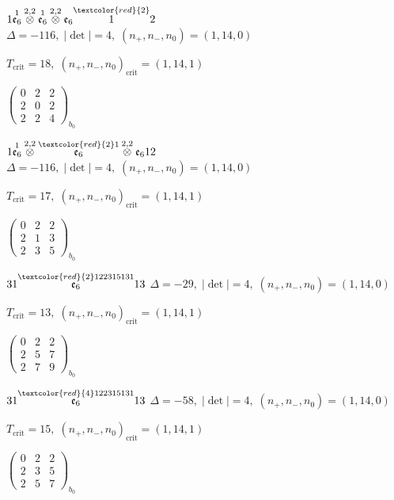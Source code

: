 \documentclass[10pt]{article}
\begin{document}
$1\overset{1}{\mathfrak{e}_6}\overset{2,2}{\otimes}\overset{1}{\mathfrak{e}_6}\overset{2,2}{\otimes}\mathfrak{e}_6\overset{\textcolor{red}{2}}{1}2$ \quad $\Delta=-116,\; |\det|=4,\; (n_+,n_-,n_0)=(1,14,0)$

\hspace{1em}$T_{\text{crit}}=18,\; (n_+,n_-,n_0)_{\text{crit}}=(1,14,1)$

\hspace{2em}$\left(\begin{smallmatrix}0 & 2 & 2 \\ 2 & 0 & 2 \\ 2 & 2 & 4\end{smallmatrix}\right)_{\!b_0}$

$1\overset{1}{\mathfrak{e}_6}\overset{2,2}{\otimes}\overset{\textcolor{red}{2}1}{\mathfrak{e}_6}\overset{2,2}{\otimes}\mathfrak{e}_612$ \quad $\Delta=-116,\; |\det|=4,\; (n_+,n_-,n_0)=(1,14,0)$

\hspace{1em}$T_{\text{crit}}=17,\; (n_+,n_-,n_0)_{\text{crit}}=(1,14,1)$

\hspace{2em}$\left(\begin{smallmatrix}0 & 2 & 2 \\ 2 & 1 & 3 \\ 2 & 3 & 5\end{smallmatrix}\right)_{\!b_0}$

\smallskip

$31\overset{\textcolor{red}{2}122315131}{\mathfrak{e}_6}13$ \quad $\Delta=-29,\; |\det|=4,\; (n_+,n_-,n_0)=(1,14,0)$

\hspace{1em}$T_{\text{crit}}=13,\; (n_+,n_-,n_0)_{\text{crit}}=(1,14,1)$

\hspace{2em}$\left(\begin{smallmatrix}0 & 2 & 2 \\ 2 & 5 & 7 \\ 2 & 7 & 9\end{smallmatrix}\right)_{\!b_0}$

$31\overset{\textcolor{red}{4}122315131}{\mathfrak{e}_6}13$ \quad $\Delta=-58,\; |\det|=4,\; (n_+,n_-,n_0)=(1,14,0)$

\hspace{1em}$T_{\text{crit}}=15,\; (n_+,n_-,n_0)_{\text{crit}}=(1,14,1)$

\hspace{2em}$\left(\begin{smallmatrix}0 & 2 & 2 \\ 2 & 3 & 5 \\ 2 & 5 & 7\end{smallmatrix}\right)_{\!b_0}$
\end{document}
